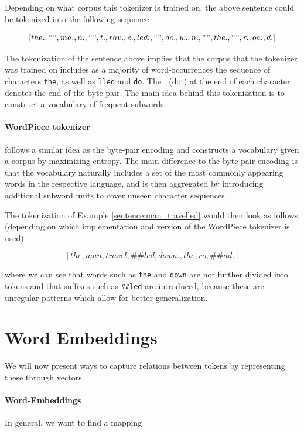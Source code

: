 \documentclass[a4paper,12pt,twoside,openright]{report}
\begin{document}
Depending on what corpus this tokenizer is trained on, the above sentence could be tokenized into the following sequence

$$
[the., " ", ma., n., " ", t., rav., e., led., " ", do., w., n., " ", the., " ", r., oa., d.]
$$

The tokenization of the sentence above implies that the corpus that the tokenizer was trained on includes as a majority of word-occurrences the sequence of characters \texttt{the}, as well as \texttt{lled} and \texttt{do}. 
The $.$ (dot) at the end of each character denotes the end of the byte-pair.
The main idea behind this tokenization is to construct a vocabulary of frequent subwords.

\paragraph{WordPiece tokenizer} \label{tokenizer:WordPiece} \cite{wu16} follows a similar idea as the byte-pair encoding and constructs a vocabulary given a corpus by maximizing entropy.
The main difference to the byte-pair encoding is that the vocabulary naturally includes a set of the most commonly appearing words in the respective language, and is then aggregated by introducing additional subword units to cover unseen character sequences.

The tokenization of Example \ref{sentence:man_travelled} would then look as follows (depending on which implementation and version of the WordPiece tokenizer is used)

$$
[the, man, travel, \#\#led, down., the, ro,  \#\#ad.]
$$

where we can see that words such as \Verb#the# and \Verb#down# are not further divided into tokens and that suffixes such as \Verb!##led! are introduced, because these are unregular patterns which allow for better generalization.






\section{Word Embeddings}

We will now present ways to capture relations between tokens by representing these through vectors.

\paragraph{Word-Embeddings}
In general, we want to find a mapping 
\end{document}
